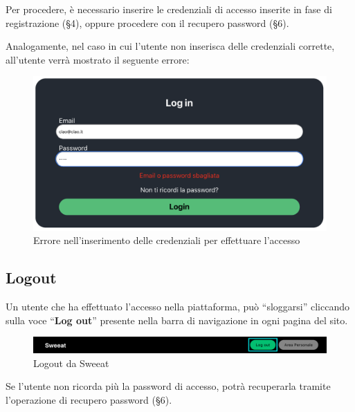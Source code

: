 Per procedere, è necessario inserire le credenziali di accesso inserite in fase di registrazione (\S{4}), oppure procedere con il recupero password (\S{6}). 

Analogamente, nel caso in cui l'utente non inserisca delle credenziali corrette, all'utente verrà mostrato il seguente errore:

\begin{figure}[H]
\centering
\includegraphics[scale=0.3]{./images/Login/AccessoNegato.png} 
\caption{Errore nell'inserimento delle credenziali per effettuare l'accesso}
\end{figure}

\subsection{Logout}

Un utente che ha effettuato l'accesso nella piattaforma, può “sloggarsi” cliccando sulla voce “\textbf{Log out}” presente nella barra di navigazione in ogni pagina del sito.

\begin{figure}[H]
\centering
\includegraphics[scale=0.15]{./images/Login/Logout.png} 
\caption{Logout da Sweeat}
\end{figure}

Se l'utente non ricorda più la password di accesso, potrà recuperarla tramite l'operazione di recupero password (\S{6}).